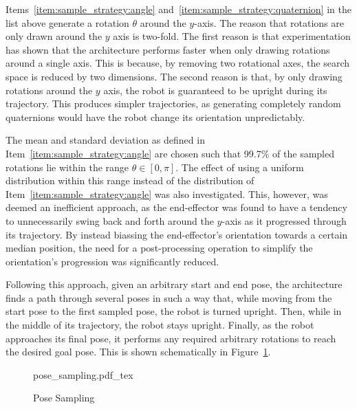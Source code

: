 		Items~\ref{item:sample_strategy:angle}
		and~\ref{item:sample_strategy:quaternion} in the list above generate a
		rotation $\theta$ around the $y$-axis. The reason that rotations are
		only drawn around the $y$ axis is two-fold. The first reason is that
		experimentation has shown that the architecture performs faster when
		only drawing rotations around a single axis. This is because, by
		removing two rotational axes, the search space is reduced by two
		dimensions. The second reason is that, by only drawing rotations around
		the $y$ axis, the robot is guaranteed to be upright during its
		trajectory. This produces simpler trajectories, as generating completely
		random quaternions would have the robot change its orientation
		unpredictably.

		The mean and standard deviation as defined in
		Item~\ref{item:sample_strategy:angle} are chosen such that 99.7\% of
		the sampled rotations lie within the range $\theta \in [0, \pi]$.
		The effect of using a uniform distribution within this range instead
		of the distribution of Item~\ref{item:sample_strategy:angle} was
		also investigated. This, however, was deemed an inefficient
		approach, as the end-effector was found to have a tendency to
		unnecessarily swing back and forth around the $y$-axis as it
		progressed through its trajectory. By instead biassing the
		end-effector's orientation towards a certain median position, the
		need for a post-processing operation to simplify the orientation's
		progression was significantly reduced.

		Following this approach, given an arbitrary start and end pose, the
		architecture finds a path through several poses in such a way that,
		while moving from the start pose to the first sampled pose, the
		robot is turned upright. Then, while in the middle of its
		trajectory, the robot stays upright. Finally, as the robot
		approaches its final pose, it performs any required arbitrary
		rotations to reach the desired goal pose. This is shown
		schematically in Figure~\ref{fig:pose_sampling}.

		\begin{figure}[hb]
			\centering
			\def\svgwidth{\columnwidth}
			{pose_sampling.pdf_tex}
			\caption{Pose Sampling}%
			\label{fig:pose_sampling}
		\end{figure}


